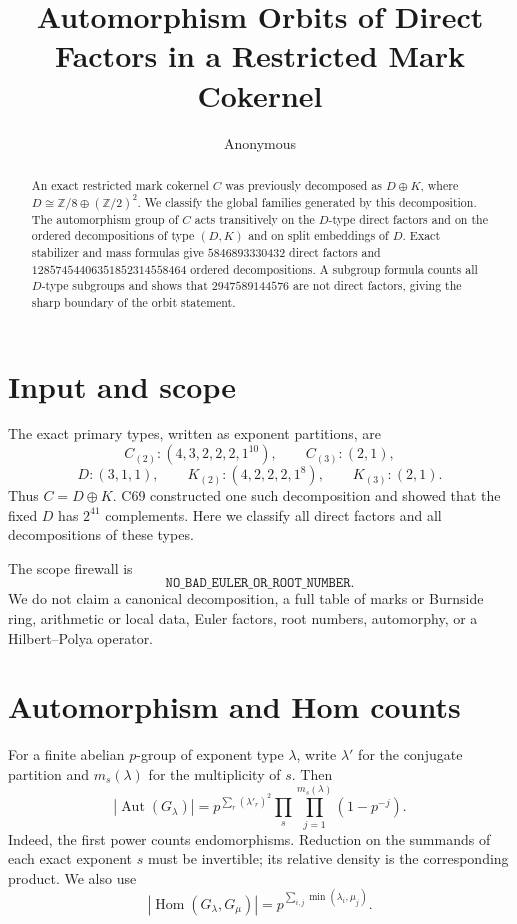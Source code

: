 \documentclass[10pt]{article}
\title{Automorphism Orbits of Direct Factors in a Restricted Mark Cokernel}
\author{Anonymous}
\date{}
\newcommand{\Aut}{\operatorname{Aut}}
\newcommand{\Hom}{\operatorname{Hom}}
\begin{document}
\maketitle

\begin{abstract}
An exact restricted mark cokernel $C$ was previously decomposed as
$D\oplus K$, where $D\cong\mathbb Z/8\oplus(\mathbb Z/2)^2$.  We classify
the global families generated by this decomposition.  The automorphism group
of $C$ acts transitively on the $D$-type direct factors and on the ordered
decompositions of type $(D,K)$ and on split embeddings of $D$.  Exact
stabilizer and mass formulas give
$5846893330432$ direct factors and
$12857454406351852314558464$ ordered decompositions.  A subgroup formula
counts all $D$-type subgroups and shows that $2947589144576$ are not direct
factors, giving the sharp boundary of the orbit statement.
\end{abstract}

\section{Input and scope}
The exact primary types, written as exponent partitions, are
\[
 C_{(2)}:(4,3,2,2,2,1^{10}),\qquad C_{(3)}:(2,1),
\]
\[
 D:(3,1,1),\qquad K_{(2)}:(4,2,2,2,1^8),\qquad K_{(3)}:(2,1).
\]
Thus $C=D\oplus K$.  C69 constructed one such decomposition and showed that
the fixed $D$ has $2^{41}$ complements.  Here we classify all direct factors
and all decompositions of these types.

The scope firewall is
\[
\texttt{NO\_BAD\_EULER\_OR\_ROOT\_NUMBER}.
\]
We do not claim a canonical decomposition, a full table of marks or Burnside
ring, arithmetic or local data, Euler factors, root numbers, automorphy, or a
Hilbert--Polya operator.

\section{Automorphism and Hom counts}
For a finite abelian $p$-group of exponent type $\lambda$, write $\lambda'$ for
the conjugate partition and $m_s(\lambda)$ for the multiplicity of $s$.  Then
\begin{equation}\label{eq:aut}
 |\Aut(G_\lambda)|=
 p^{\sum_r(\lambda'_r)^2}
 \prod_s\prod_{j=1}^{m_s(\lambda)}(1-p^{-j}).
\end{equation}
Indeed, the first power counts endomorphisms.  Reduction on the summands of
each exact exponent $s$ must be invertible; its relative density is the
corresponding product.  We also use
\begin{equation}\label{eq:hom}
 |\Hom(G_\lambda,G_\mu)|=
 p^{\sum_{i,j}\min(\lambda_i,\mu_j)}.
\end{equation}
\end{document}
